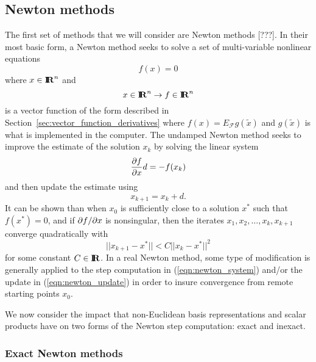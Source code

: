 \documentclass[pdf,ps2pdf,11pt]{SANDreport}
\begin{document}
\subsection{Newton methods}

The first set of methods that we will consider are Newton methods [???].  In
their most basic form, a Newton method seeks to solve a set of multi-variable
nonlinear equations
%
\[
f(x) = 0
\]
%
where $x\in\mbox{\textbf{I}}\hspace{-0.6ex}\mbox{\textbf{R}}^n$ and
%
\[
x\in\mbox{\textbf{I}}\hspace{-0.6ex}\mbox{\textbf{R}}^n \rightarrow f\in\mbox{\textbf{I}}\hspace{-0.6ex}\mbox{\textbf{R}}^n
\]
%
is a vector function of the form described in
Section~\ref{sec:vector_function_derivatives} where $f(x) = E_{\mathcal{F}}
g(\tilde{x})$ and $g(\tilde{x})$ is what is implemented in the computer.  The
undamped Newton method seeks to improve the estimate of the solution $x_k$ by
solving the linear system
%
\begin{equation}
\displaystyle{\frac{\partial f}{\partial x}} d = - f(x_k)
\label{eqn:newton_system}
\end{equation}
%
and then update the estimate using
%
\begin{equation}
x_{k+1} = x_k + d.
\label{eqn:newton_update}
\end{equation}
%
It can be shown than when $x_0$ is sufficiently close to a solution $x^*$ such
that $f(x^*)=0$, and if $\partial f / \partial x$ is nonsingular, then the iterates $x_1,
x_2, {}\ldots, x_k, x_{k+1}$ converge quadratically with
%
\[
||x_{k+1}-x^*|| < C ||x_k-x^*||^2
\]
for some constant $C\in\mbox{\textbf{I}}\hspace{-0.6ex}\mbox{\textbf{R}}$.  In a real Newton method, some type of
modification is generally applied to the step computation in
(\ref{eqn:newton_system}) and/or the update in (\ref{eqn:newton_update}) in
order to insure convergence from remote starting points $x_0$.

We now consider the impact that non-Euclidean basis representations and scalar
products have on two forms of the Newton step computation: exact and inexact.

\subsubsection{Exact Newton methods}
\end{document}
